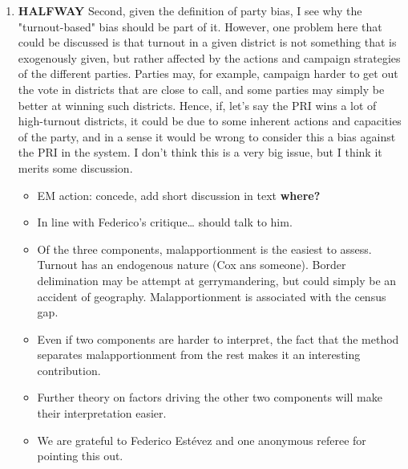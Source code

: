 \documentclass{article}
\begin{document}
\begin{enumerate}
\item {\bfseries\sffamily HALFWAY} Second, given the definition of party bias, I see why the "turnout-based" bias should be part of it. However, one problem here that could be discussed is that turnout in a given district is not something that is exogenously given, but rather affected by the actions and campaign strategies of the different parties. Parties may, for example, campaign harder to get out the vote in districts that are close to call, and some parties may simply be better at winning such districts. Hence, if, let's say the PRI wins a lot of high-turnout districts, it could be due to some inherent actions and capacities of the party, and in a sense it would be wrong to consider this a bias against the PRI in the system. I don't think this is a very big issue, but I think it merits some discussion.
\label{sec:orgheadline11}
\begin{itemize}
\item EM action: concede, add short discussion in text \textbf{where?}
\item In line with Federico's critique\ldots{} should talk to him.
\item Of the three components, malapportionment is the easiest to assess. Turnout has an endogenous nature (Cox ans someone). Border delimination may be attempt at gerrymandering, but could simply be an accident of geography. Malapportionment is associated with the census gap.
\item Even if two components are harder to interpret, the fact that the method separates malapportionment from the rest makes it an interesting contribution.
\item Further theory on factors driving the other two components will make their interpretation easier.
\item We are grateful to Federico Estévez and one anonymous referee for pointing this out.
\end{itemize}


\end{enumerate}
\end{document}

